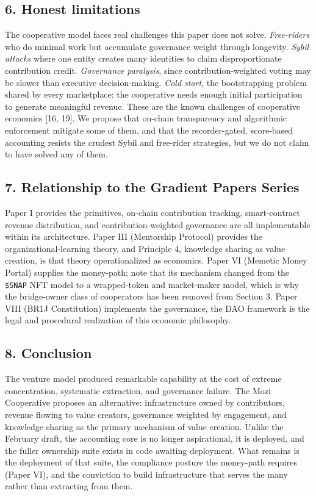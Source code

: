\subsection{6. Honest limitations}\label{honest-limitations}

The cooperative model faces real challenges this paper does not solve.
\emph{Free-riders} who do minimal work but accumulate governance weight
through longevity. \emph{Sybil attacks} where one entity creates many
identities to claim disproportionate contribution credit.
\emph{Governance paralysis}, since contribution-weighted voting may be
slower than executive decision-making. \emph{Cold start}, the
bootstrapping problem shared by every marketplace: the cooperative needs
enough initial participation to generate meaningful revenue. These are
the known challenges of cooperative economics {[}16, 19{]}. We propose
that on-chain transparency and algorithmic enforcement mitigate some of
them, and that the recorder-gated, score-based accounting resists the
crudest Sybil and free-rider strategies, but we do not claim to have
solved any of them.

\subsection{7. Relationship to the Gradient Papers
Series}\label{relationship-to-the-gradient-papers-series}

Paper I provides the primitives, on-chain contribution tracking,
smart-contract revenue distribution, and contribution-weighted
governance are all implementable within its architecture. Paper III
(Mentorship Protocol) provides the organizational-learning theory, and
Principle 4, knowledge sharing as value creation, is that theory
operationalized as economics. Paper VI (Memetic Money Portal) supplies
the money-path; note that its mechanism changed from the \texttt{\$SNAP}
NFT model to a wrapped-token and market-maker model, which is why the
bridge-owner class of cooperators has been removed from Section 3. Paper
VIII (BR1J Constitution) implements the governance, the DAO framework is
the legal and procedural realization of this economic philosophy.

\subsection{8. Conclusion}\label{conclusion}

The venture model produced remarkable capability at the cost of extreme
concentration, systematic extraction, and governance failure. The Mozi
Cooperative proposes an alternative: infrastructure owned by
contributors, revenue flowing to value creators, governance weighted by
engagement, and knowledge sharing as the primary mechanism of value
creation. Unlike the February draft, the accounting core is no longer
aspirational, it is deployed, and the fuller ownership suite exists in
code awaiting deployment. What remains is the deployment of that suite,
the compliance posture the money-path requires (Paper VI), and the
conviction to build infrastructure that serves the many rather than
extracting from them.

